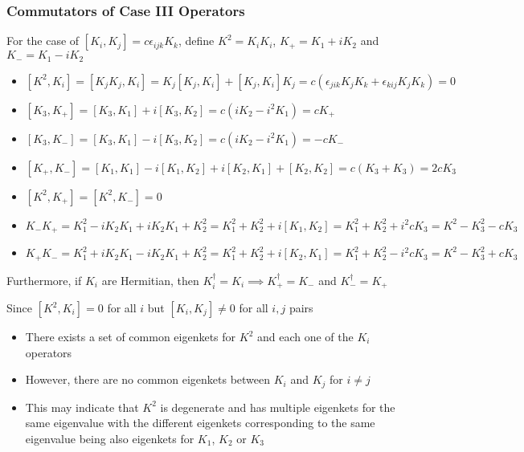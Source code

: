 \documentclass[8pt,t,mathserif,aspectratio=169]{beamer}
\begin{document}
\begin{frame}
  \frametitle{Commutators of Case III Operators}
  \vspace{1mm}
  For the case of $[K_i,K_j] = c \epsilon_{ijk} K_k$, define $K^2 = K_i K_i$, $K_{+} = K_1 + i K_2$ and $K_{-} = K_1 - i K_2$
  \begin{itemize}
    \item $[K^2,K_i] = [K_j K_j,K_i] = K_j [K_j,K_i] + [K_j,K_i]K_j = c(\epsilon_{jik} K_j K_k + \epsilon_{kij} K_j K_k) = 0$
    \item $[K_3,K_{+}] = [K_3,K_1] + i[K_3,K_2] = c(iK_2 - i^2 K_1) = c K_{+}$
    \item $[K_3,K_{-}] = [K_3,K_1] - i[K_3,K_2] = c(iK_2 - i^2 K_1) = -c K_{-}$
    \item $[K_{+},K_{-}] = [K_1,K_1] - i[K_1,K_2] + i[K_2,K_1] + [K_2,K_2] = c(K_3 + K_3) = 2cK_3$
    \item $[K^2,K_{+}] = [K^2,K_{-}] = 0$
    \item $K_{-} K_{+} = K_{1}^{2} - i K_2 K_1  + i K_2 K_1 + K_{2}^{2} = K_{1}^{2} + K_{2}^{2} + i[K_1,K_2] = K_{1}^{2} + K_{2}^{2} + i^2 c K_3 = K^{2} - K_{3}^{2} - c K_3$
    \item $K_{+} K_{-} = K_{1}^{2} + i K_2 K_1  - i K_2 K_1 + K_{2}^{2} = K_{1}^{2} + K_{2}^{2} + i[K_2,K_1] = K_{1}^{2} + K_{2}^{2} - i^2 c K_3 = K^{2} - K_{3}^{2} + c K_3$
  \end{itemize}
  Furthermore, if $K_i$ are Hermitian, then $K_i^{\dagger} = K_i \implies K_{+}^{\dagger} = K_{-}$ and $K_{-}^{\dagger} = K_{+}$
  
  Since $[K^2,K_i] = 0$ for all $i$ but $[K_i,K_j] \neq 0$ for all $i,j$ pairs
  \begin{itemize}
    \item There exists a set of common eigenkets for $K^2$ and each one of the $K_i$ operators
    \item However, there are no common eigenkets between $K_i$ and $K_j$ for $i \neq j$
    \item This may indicate that $K^2$ is degenerate and has multiple eigenkets for the same eigenvalue with the different eigenkets corresponding to the same eigenvalue being also eigenkets for $K_1$, $K_2$ or $K_3$
  \end{itemize}
\end{frame}
\end{document}
